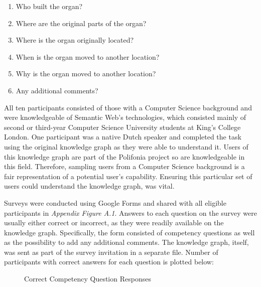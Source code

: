 \begin{enumerate}
    \item Who built the organ?
    \vspace{-0.25cm}
    \item Where are the original parts of the organ?
    \vspace{-0.25cm}
    \item Where is the organ originally located?
    \vspace{-0.25cm}
    \item When is the organ moved to another location?
    \vspace{-0.25cm}
    \item Why is the organ moved to another location? 
    \vspace{-0.25cm}
    \item Any additional comments?
\end{enumerate}

All ten participants consisted of those with a Computer Science background and were knowledgeable of Semantic Web's technologies, which consisted mainly of second or third-year Computer Science University students at King's College London. One participant was a native Dutch speaker and completed the task using the original knowledge graph as they were able to understand it. Users of this knowledge graph are part of the Polifonia project so are knowledgeable in this field. Therefore, sampling users from a Computer Science background is a fair representation of a potential user's capability. Ensuring this particular set of users could understand the knowledge graph, was vital. 

Surveys were conducted using Google Forms and shared with all eligible participants in \textit{Appendix Figure A.1}. Answers to each question on the survey were usually either correct or incorrect, as they were readily available on the knowledge graph. Specifically, the form consisted of competency questions as well as the possibility to add any additional comments. The knowledge graph, itself, was sent as part of the survey invitation in a separate file. Number of participants with correct answers for each question is plotted below: 

\begin{figure}[H]
\begin{center}
\end{center}
\vspace{-0.8cm}
\caption{Correct Competency Question Responses}
\end{figure}
\vspace{-0.15cm}

